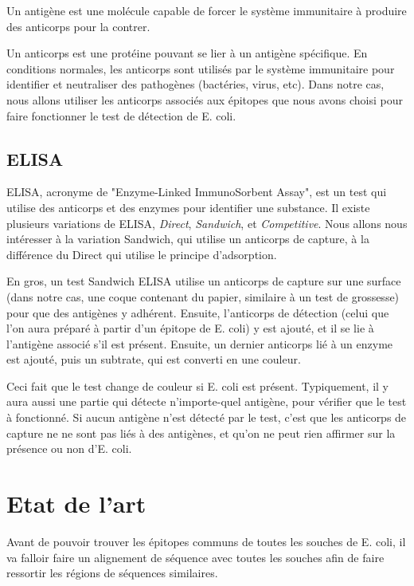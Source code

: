 \documentclass{article}
\begin{document}
      Un antigène est une molécule capable de forcer le système immunitaire à produire des anticorps pour la contrer.
      
      Un anticorps est une protéine pouvant se lier à un antigène spécifique. En conditions normales, les anticorps sont utilisés par le système immunitaire pour identifier et neutraliser des pathogènes (bactéries, virus, etc). Dans notre cas, nous allons utiliser les anticorps associés aux épitopes que nous avons choisi pour faire fonctionner le test de détection de E. coli.
      
    \subsection{ELISA}
      ELISA, acronyme de "Enzyme-Linked ImmunoSorbent Assay", est un test qui utilise des anticorps et des enzymes pour identifier une substance. Il existe plusieurs variations de ELISA, \textit{Direct}, \textit{Sandwich}, et \textit{Competitive}. Nous allons nous intéresser à la variation Sandwich, qui utilise un anticorps de capture, à la différence du Direct qui utilise le principe d'adsorption.
      
      En gros, un test Sandwich ELISA utilise un anticorps de capture sur une surface (dans notre cas, une coque contenant du papier, similaire à un test de grossesse) pour que des antigènes y adhérent. Ensuite, l'anticorps de détection (celui que l'on aura préparé à partir d'un épitope de E. coli) y est ajouté, et il se lie à l'antigène associé s'il est présent. Ensuite, un dernier anticorps lié à un enzyme est ajouté, puis un subtrate, qui est converti en une couleur.
      
      Ceci fait que le test change de couleur si E. coli est présent. Typiquement, il y aura aussi une partie qui détecte n'importe-quel antigène, pour vérifier que le test à fonctionné. Si aucun antigène n'est détecté par le test, c'est que les anticorps de capture ne ne sont pas liés à des antigènes, et qu'on ne peut rien affirmer sur la présence ou non d'E. coli.
      
  \section{Etat de l'art}
Avant de pouvoir trouver les épitopes communs de toutes les souches de E. coli, il va falloir faire un alignement de séquence avec toutes les souches afin de faire ressortir les régions de séquences similaires. \\
\end{document}
